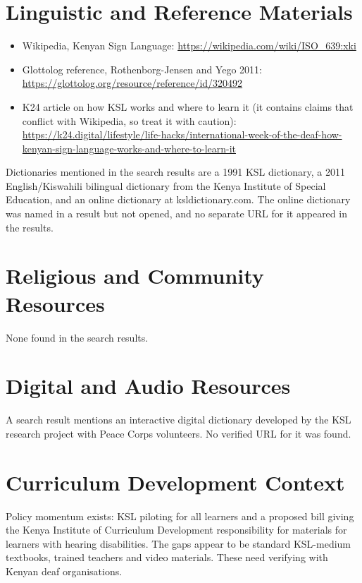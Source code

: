 \documentclass[12pt]{article}
\begin{document}
\section{Linguistic and Reference Materials}
\begin{itemize}
\item Wikipedia, Kenyan Sign Language: \url{https://wikipedia.com/wiki/ISO_639:xki}
\item Glottolog reference, Rothenborg-Jensen and Yego 2011: \url{https://glottolog.org/resource/reference/id/320492}
\item K24 article on how KSL works and where to learn it (it contains claims that conflict with Wikipedia, so treat it with caution): \url{https://k24.digital/lifestyle/life-hacks/international-week-of-the-deaf-how-kenyan-sign-language-works-and-where-to-learn-it}
\end{itemize}
Dictionaries mentioned in the search results are a 1991 KSL dictionary, a 2011 English/Kiswahili bilingual dictionary from the Kenya Institute of Special Education, and an online dictionary at ksldictionary.com. The online dictionary was named in a result but not opened, and no separate URL for it appeared in the results.

\section{Religious and Community Resources}
None found in the search results.

\section{Digital and Audio Resources}
A search result mentions an interactive digital dictionary developed by the KSL research project with Peace Corps volunteers. No verified URL for it was found.

\section{Curriculum Development Context}
Policy momentum exists: KSL piloting for all learners and a proposed bill giving the Kenya Institute of Curriculum Development responsibility for materials for learners with hearing disabilities. The gaps appear to be standard KSL-medium textbooks, trained teachers and video materials. These need verifying with Kenyan deaf organisations.
\end{document}
